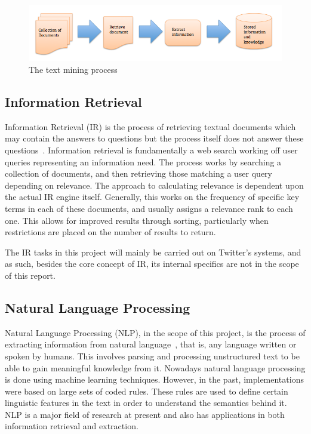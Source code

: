 \begin{figure}[t]
\begin{center}
\includegraphics[width=15cm]{tm}
\end{center}
\caption{The text mining process \cite{Gupta_Lehal_2009}}
\label{fig:tm}
\end{figure}

\subsection{Information Retrieval}
Information Retrieval (IR) is the process of retrieving textual documents which may contain the answers to questions but the process itself does not answer these questions~\cite{Hearst:1999}. Information retrieval is fundamentally a web search working off user queries representing an information need. The process works by searching a collection of documents, and then retrieving those matching a user query depending on relevance. The approach to calculating relevance is dependent upon the actual IR engine itself. Generally, this works on the frequency of specific key terms in each of these documents, and usually assigns a relevance rank to each one. This allows for improved results through sorting, particularly when restrictions are placed on the number of results to return.

The IR tasks in this project will mainly be carried out on Twitter's systems, and as such, besides the core concept of IR, its internal specifics are not in the scope of this report.

\subsection{Natural Language Processing}
Natural Language Processing (NLP), in the scope of this project, is the process of extracting information from natural language~\cite{Healey98}, that is, any language written or spoken by humans. This involves parsing and processing unstructured text to be able to gain meaningful knowledge from it. Nowadays natural language processing is done using machine learning techniques. However, in the past, implementations were based on large sets of coded rules. These rules are used to define certain linguistic features in the text in order to understand the semantics behind it. NLP is a major field of research at present and also has applications in both information retrieval and extraction.

